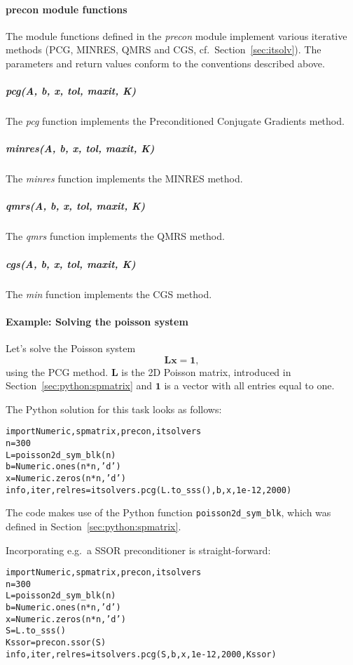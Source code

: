 \documentclass[a4paper]{article}
\newcommand{\mat}[1]{\ensuremath{\boldsymbol{#1}}}
\newcommand{\vect}[1]{\ensuremath{\mathbf{#1}}}
\newlength{\pyindent} \newlength{\pyminipagewidth}
\newenvironment{pycode}{\begin{trivlist}\item\hspace*{\pyindent}\begin{minipage}{\pyminipagewidth}\small\begin{alltt}}
      {\end{alltt}\end{minipage}\end{trivlist}}
\begin{document}
\paragraph{precon module functions}
%
The module functions defined in the \textit{precon} module implement
various iterative methods (PCG, MINRES, QMRS and CGS, cf.\ 
Section~\ref{sec:itsolv}). The parameters and return values conform to
the conventions described above.

\subparagraph{pcg(A, b, x, tol, maxit, K)}
%
The \textit{pcg} function implements the Preconditioned Conjugate
Gradients method.

\subparagraph{minres(A, b, x, tol, maxit, K)}
%
The \textit{minres} function implements the MINRES method.

\subparagraph{qmrs(A, b, x, tol, maxit, K)}
%
The \textit{qmrs} function implements the QMRS method.

\subparagraph{cgs(A, b, x, tol, maxit, K)} The \textit{min} function
implements the CGS method.
%

\paragraph{Example: Solving the poisson system}
%
Let's solve the Poisson system
\begin{equation}
  \label{eq:python:1}
  \mat{L} \vect{x} = \vect{1},
\end{equation}
using the PCG method. $\mat{L}$ is the 2D Poisson matrix, introduced
in Section~\ref{sec:python:spmatrix} and $\vect{1}$ is a vector with
all entries equal to one.

\noindent The Python solution for this task looks as follows:
\begin{pycode}
import Numeric, spmatrix, precon, itsolvers
n = 300
L = poisson2d_sym_blk(n)
b = Numeric.ones(n*n, 'd')
x = Numeric.zeros(n*n, 'd')
info, iter, relres = itsolvers.pcg(L.to_sss(), b, x, 1e-12, 2000)
\end{pycode}
The code makes use of the Python function \texttt{poisson2d\_sym\_blk},
which was defined in Section~\ref{sec:python:spmatrix}.

\noindent Incorporating e.g.\ a SSOR preconditioner is straight-forward:
\begin{pycode}
import Numeric, spmatrix, precon, itsolvers
n = 300
L = poisson2d_sym_blk(n)
b = Numeric.ones(n*n, 'd')
x = Numeric.zeros(n*n, 'd')
S = L.to_sss()
Kssor = precon.ssor(S)
info, iter, relres = itsolvers.pcg(S, b, x, 1e-12, 2000, Kssor)
\end{pycode}
\end{document}
